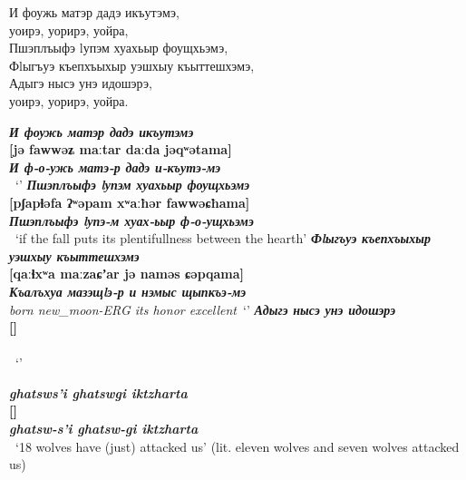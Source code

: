 \documentclass[a4paper,12pt]{book}
\newcommand{\1}[1]{\textbf{\emph{#1}}} %
\newcommand{\2}[1]{\textbf{[#1]}} %
\newcommand{\3}[1]{\fontsize{11pt}{0cm}\textbf{\emph{#1}}} %
\newcommand{\4}[1]{\fontsize{10pt}{0cm}\emph{#1}}	%
\newcommand{\5}[1]{\textbf{/#1/}} %
\newcommand{\6}[1]{\textbf{[#1]}} %
\newcommand{\7}[1]{\fontsize{12pt}{0cm}\emph{#1}} %
\newcommand{\8}[1]{\fontsize{12pt}{0cm}`#1'} %
\newcommand{\9}[1]{\fontsize{12pt}{0cm}(lit. `#1')} %
\begin{document}
И фоужь матэр дадэ икъутэмэ,\\
уоирэ, уорирэ, уойра,\\
Пшэплъыфэ lупэм хуахьыр фоущхьэмэ,\\
Фlыгъуэ къепхъыхыр уэшхыу къыттешхэмэ,\\
Адыгэ нысэ унэ идошэрэ,\\
уоирэ, уорирэ, уойра.\\

\begin{exe}
\ex
\1{И фоужь матэр дадэ икъутэмэ}\\
\2{jə fawwəʑ maːtar daːda jəqʷətama}\\
\3{И ф-о-ужь матэ-р дадэ и-къутэ-мэ}\\
\4{}\
\trans \8{}
\ex
\1{Пшэплъыфэ lупэм хуахьыр фоущхьэмэ}\\
\2{pʃapɬəfa ʔʷəpam xʷaːħər fawwəɕħama}\\
\3{Пшэплъыфэ lупэ-м хуах-ьыр ф-о-ущхьэмэ}\\
\4{}\
\trans \8{if the fall puts its plentifullness between the hearth}
\ex
\1{Фlыгъуэ къепхъыхыр уэшхыу къыттешхэмэ}\\
\2{qaːɬxʷa maːzaɕʼar jə naməs ɕəpqama}\\
\3{Къалъхуа мазэщlэ-р и нэмыс щыпкъэ-мэ}\\
\4{born new_moon-ERG its honor excellent}\
\trans \8{}
\ex
\1{Адыгэ нысэ унэ идошэрэ}\\
\2{}\\
\3{}\\
\4{}\
\trans \8{}

\end{exe}




\begin{exe}
\ex
\1{ghatsws'i ghatswgi iktzharta}\\
\2{}\\
\3{ghatsw-s'i ghatsw-gi iktzharta}\\
\4{}\
\trans \8{18 wolves have (just) attacked us} (lit. eleven wolves and seven wolves attacked us)
\end{exe}
\end{document}
